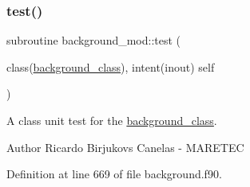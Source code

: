 \subsubsection{\texorpdfstring{test()}{test()}}
{\footnotesize\ttfamily subroutine background\+\_\+mod\+::test (\begin{DoxyParamCaption}\item[{class(\mbox{\hyperlink{structbackground__mod_1_1background__class}{background\+\_\+class}}), intent(inout)}]{self }\end{DoxyParamCaption})\hspace{0.3cm}{\ttfamily [private]}}



A class \textquotesingle{}unit\textquotesingle{} test for the \mbox{\hyperlink{structbackground__mod_1_1background__class}{background\+\_\+class}}. 

\begin{DoxyAuthor}{Author}
Ricardo Birjukovs Canelas -\/ M\+A\+R\+E\+T\+EC 
\end{DoxyAuthor}


Definition at line 669 of file background.\+f90.


